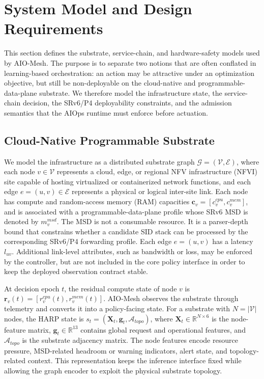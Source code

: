 \documentclass[final,5p]{elsarticle}
\newcommand{\rev}[1]{\textcolor{revisiongreen}{#1}}
\let\newrev\rev
\begin{document}
\section{System Model and Design Requirements}
\label{sec:system_model}

This section defines the substrate, service-chain, and hardware-safety models used by AIO-Mesh. The purpose is to separate two notions that are often conflated in learning-based orchestration: an action may be attractive under an optimization objective, but still be non-deployable on the cloud-native and programmable-data-plane substrate. We therefore model the infrastructure state, the service-chain decision, the SRv6/P4 deployability constraints, and the admission semantics that the AIOps runtime must enforce before actuation.

\subsection{Cloud-Native Programmable Substrate}
\label{subsec:infrastructure_model}

We model the infrastructure as a distributed substrate graph $\mathcal{G}=(\mathcal{V},\mathcal{E})$, where each node \(v\in\mathcal{V}\) represents a cloud, edge, or regional \rev{NFV infrastructure (NFVI)} site capable of hosting virtualized or containerized network functions, and each edge \(e=(u,v)\in\mathcal{E}\) represents a physical or logical inter-site link. Each node has compute and \newrev{random-access memory (RAM)} capacities $\mathbf{c}_v=\left[c_v^{cpu},c_v^{mem}\right]$, and is associated with a programmable-data-plane profile whose SRv6 \rev{MSD} is denoted by \(m_v^{msd}\). The MSD is not a consumable resource. It is a parser-depth bound that constrains whether a candidate SID stack can be processed by the corresponding SRv6/P4 forwarding profile. Each edge \(e=(u,v)\) has a latency \(l_{uv}\). Additional link-level attributes, such as bandwidth or loss, may be enforced by the controller, but are not included in the core policy interface in order to keep the deployed observation contract stable.

At decision epoch \(t\), the residual compute state of node \(v\) is $\mathbf{r}_v(t)=\left[r_v^{cpu}(t),r_v^{mem}(t)\right]$. AIO-Mesh observes the substrate through telemetry and converts it into a policy-facing state. For a substrate with \(N=|\mathcal{V}|\) nodes, the HARP state is $s_t=(\mathbf{X}_t,\mathbf{g}_t,\mathcal{A}_{topo})$, where \(\mathbf{X}_t\in\mathbb{R}^{N\times 6}\) is the node-feature matrix, \(\mathbf{g}_t\in\mathbb{R}^{13}\) contains global request and operational features, and \(\mathcal{A}_{topo}\) is the substrate adjacency matrix. The node features encode resource pressure, MSD-related headroom or warning indicators, alert state, and topology-related context. This representation keeps the inference interface fixed while allowing the graph encoder to exploit the physical substrate topology.
\end{document}
